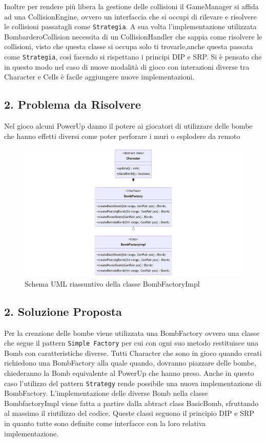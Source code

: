\documentclass[a4paper,12pt]{report}
\begin{document}
\par
Inoltre per rendere più libera la gestione delle collisioni il GameManager si affida ad una CollisionEngine, ovvero un interfaccia che si occupi di rilevare e risolvere le collisioni passatagli come \verb|Strategia|.
A sua volta l'implementazione utilizzata BombarderoCollision necessita di un CollisionHandler che sappia come risolvere le collisioni, visto che questa classe si occupa solo ti trovarle,anche questa passata come \verb|Strategia|, così facendo si rispettano i principi DIP e SRP.
Si è pensato che in questo modo nel caso di nuove modalità di gioco con interazioni diverse tra Character e Cells è facile aggiungere nuove implementazioni.

\subsection*{2. Problema da Risolvere}
\par
Nel gioco alcuni PowerUp danno il potere ai giocatori di utilizzare delle bombe che hanno effetti diversi come poter perforare i muri o esplodere da remoto

\begin{figure}[H]
\centering{}
\includegraphics[width=\textwidth]{img/bombFactory.png}
\caption{Schema UML riassuntivo della classe BombFactoryImpl}
\end{figure}

\subsection*{2. Soluzione Proposta}
\par
Per la creazione delle bombe viene utilizzata una BombFactory ovvero una classe che segue il pattern \verb|Simple Factory| per cui con ogni suo metodo restituisce una Bomb con caratteristiche diverse. Tutti Character che sono in gioco quando creati richiedono una BombFactory alla quale quando, dovranno piazzare delle bombe, chiederanno la Bomb equivalente al PowerUp che hanno preso. Anche in questo caso l'utilizzo del pattern \verb|Strategy| rende possibile una nuova implementazione di BombFactory.  L'implementazione delle diverse Bomb nella classe BombfactoryImpl viene fatta a partire dalla abtract class BasicBomb, sfruttando al massimo il riutilizzo del codice.
Queste classi seguono il principio DIP e SRP in quanto tutte sono definite come interfacce con la loro relativa implementazione.
\end{document}
